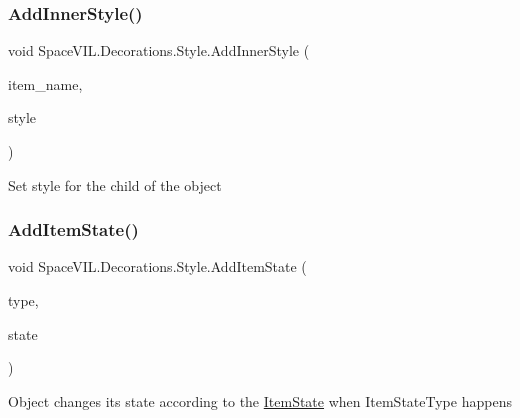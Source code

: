 \subsubsection{\texorpdfstring{Add\+Inner\+Style()}{AddInnerStyle()}}
{\footnotesize\ttfamily void Space\+V\+I\+L.\+Decorations.\+Style.\+Add\+Inner\+Style (\begin{DoxyParamCaption}\item[{String}]{item\+\_\+name,  }\item[{\mbox{\hyperlink{class_space_v_i_l_1_1_decorations_1_1_style}{Style}}}]{style }\end{DoxyParamCaption})\hspace{0.3cm}{\ttfamily [inline]}}



Set style for the child of the object 

\mbox{\label{class_space_v_i_l_1_1_decorations_1_1_style_a738cd9c81f6a8b10a2a59de982ebdf6d}} 
\subsubsection{\texorpdfstring{Add\+Item\+State()}{AddItemState()}}
{\footnotesize\ttfamily void Space\+V\+I\+L.\+Decorations.\+Style.\+Add\+Item\+State (\begin{DoxyParamCaption}\item[{Item\+State\+Type}]{type,  }\item[{\mbox{\hyperlink{class_space_v_i_l_1_1_decorations_1_1_item_state}{Item\+State}}}]{state }\end{DoxyParamCaption})\hspace{0.3cm}{\ttfamily [inline]}}



Object changes its state according to the \mbox{\hyperlink{class_space_v_i_l_1_1_decorations_1_1_item_state}{Item\+State}} when Item\+State\+Type happens 

\mbox{\label{class_space_v_i_l_1_1_decorations_1_1_style_ac96f01bb7a62301810a935292a9066f9}} 
